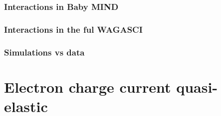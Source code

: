 \subsubsection{Interactions in Baby MIND}

\subsubsection{Interactions in the ful WAGASCI}

\subsubsection{Simulations vs data}



\section{Electron charge current quasi-elastic}

